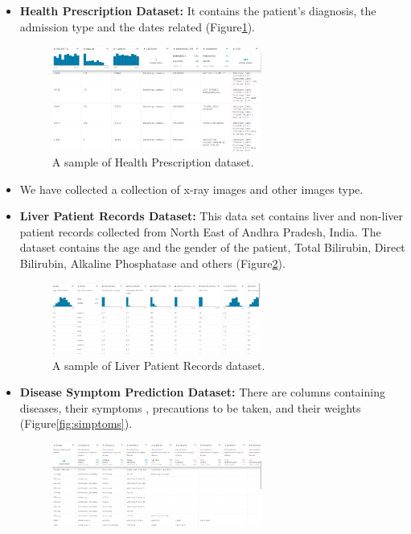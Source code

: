 \begin{itemize}
   \item \textbf{Health Prescription Dataset: }It contains the patient's diagnosis, the admission type and the dates related (Figure\ref{fig:presc}).
   \begin{figure}[h!]
    \center
    \includegraphics[width=0.65\textwidth]{images/chapter3/dataset/healthprescription.PNG}
    \caption{A sample of Health Prescription dataset.}
    \label{fig:presc}
  \end{figure}
  \item We have collected a collection of x-ray images and other images type.
  \newpage
  \item \textbf{Liver Patient Records Dataset:} This data set contains liver and non-liver patient records collected from North East of Andhra Pradesh, India. The dataset contains the age and the gender of the patient, Total Bilirubin, Direct Bilirubin, Alkaline Phosphatase and others (Figure\ref{fig:liver}).
  \begin{figure}[h!]
    \center
    \includegraphics[width=0.65\textwidth]{images/chapter3/dataset/indianliver.PNG}
    \caption{A sample of Liver Patient Records dataset.}
    \label{fig:liver}
  \end{figure}
  \item \textbf{Disease Symptom Prediction Dataset:} There are columns containing diseases, their symptoms , precautions to be taken, and their weights (Figure\ref{fig:simptoms}).
  \begin{figure}[h!]
    \center
    \includegraphics[width=0.65\textwidth]{images/chapter3/dataset/simptoms.PNG}

\end{figure}
\end{itemize}
